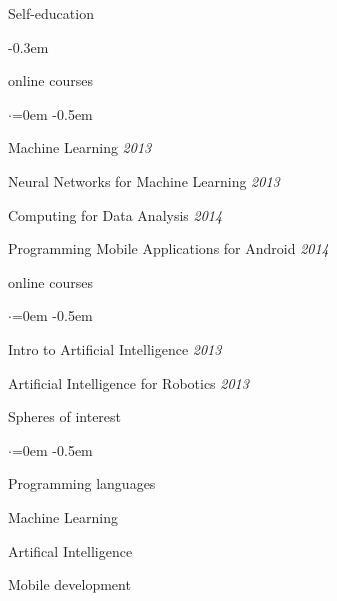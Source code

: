 \documentclass{resume} %
\begin{document}
\begin{rSection}{Self-education}

\begin{description} \itemsep -0.3em
  \item[Coursera] \hfill {online courses}
  \begin{list}{$\cdot$}{\leftmargin=0em} %
    \itemsep -0.5em \vspace{-0.5em} %
    \item Machine Learning \hfill {\em 2013}
    \item Neural Networks for Machine Learning \hfill {\em  2013}
    \item Computing for Data Analysis \hfill {\em  2014}
    \item Programming Mobile Applications for Android \hfill {\em  2014}
  \end{list}
  \item[Udacity] \hfill {online courses}
  \begin{list}{$\cdot$}{\leftmargin=0em} %
    \itemsep -0.5em \vspace{-0.5em} %
    \item Intro to Artificial Intelligence \hfill {\em  2013}
    \item Artificial Intelligence for Robotics \hfill {\em  2013}
  \end{list}
\end{description}

\end{rSection}


\begin{rSection}{Spheres of interest}
  \smallskip
  \begin{list}{$\cdot$}{\leftmargin=0em} %
    \itemsep -0.5em \vspace{-0.3em} %
  \item Programming languages
  \item Machine Learning
  \item Artifical Intelligence
  \item Mobile development
  \end{list}
\end{rSection}
\end{document}
